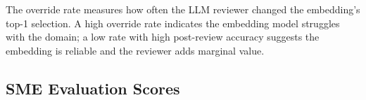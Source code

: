 The override rate measures how often the LLM reviewer changed the embedding's top-1 selection. A high override rate indicates the embedding model struggles with the domain; a low rate with high post-review accuracy suggests the embedding is reliable and the reviewer adds marginal value.

\subsection{SME Evaluation Scores}


